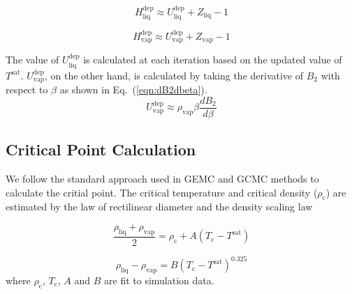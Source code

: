 \documentclass[5p,times]{elsarticle}
\begin{document}
\begin{equation}
H^{\mathrm{dep}}_\mathrm{liq} \approx U^{\mathrm{dep}}_\mathrm{liq}+Z_\mathrm{liq} - 1
\label{eqn:HsatLiq}
\end{equation}

\begin{equation}
H^{\mathrm{dep}}_\mathrm{vap} \approx U^{\mathrm{dep}}_\mathrm{vap}+Z_\mathrm{vap} - 1
\label{eqn:HsatVap}
\end{equation}

The value of $U^{\mathrm{dep}}_\mathrm{liq}$ is calculated at each iteration based on the updated value of $T^{\mathrm{sat}}$. $U^{\mathrm{dep}}_\mathrm{vap}$, on the other hand, is calculated by taking the derivative of $B_2$ with respect to $\beta$ as shown in Eq.~(\ref{eqn:dB2dbeta}).
\begin{equation}
U^{\mathrm{dep}}_\mathrm{vap}\approx \rho_{\mathrm{vap}} \beta \frac{dB_2}{d\beta}
\label{eqn:dB2dbeta}
\end{equation}

\subsection{Critical Point Calculation}\label{sec:PcCalc}
We follow the standard approach used in GEMC and GCMC methods to calculate the critial point. The critical temperature and critical density ($\rho_\mathrm{c}$) are estimated by the law of rectilinear diameter \cite{Rowlinson1982} and the density scaling law \cite{Rowlinson2013}

\begin{equation}
\frac{\rho_{\mathrm{liq}} +\rho_{\mathrm{vap}}}{2}=\rho_\mathrm{c}+A(T_\mathrm{c}-T^{\mathrm{sat}})
\label{eqn:rectilinearLaw}
\end{equation}

\begin{equation}
\rho_{\mathrm{liq}} -\rho_{\mathrm{vap}}=B(T_\mathrm{c}-T^{\mathrm{sat}})^{0.325}
\label{eqn:scalingLaw}
\end{equation}
where $\rho_\mathrm{c}$, $ T_\mathrm{c}$, $A$ and $B$ are fit to simulation data.

			
\end{document}
